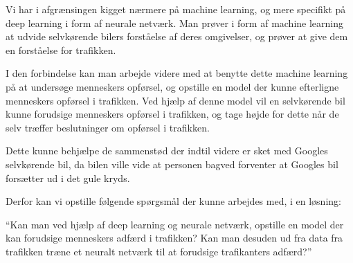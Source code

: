 Vi har i afgrænsingen kigget nærmere på machine learning, og mere specifikt på deep learning i form af neurale netværk. Man prøver i form af machine learning at udvide selvkørende bilers forståelse af deres omgivelser, og prøver at give dem en forståelse for trafikken. 

I den forbindelse kan man arbejde videre med at benytte dette machine learning på at undersøge menneskers opførsel, og opstille en model der kunne efterligne menneskers opførsel i trafikken. Ved hjælp af denne model vil en selvkørende bil kunne forudsige menneskers opførsel i trafikken, og tage højde for dette når de selv træffer beslutninger om opførsel i trafikken. 

Dette kunne behjælpe de sammenstød der indtil videre er sket med Googles selvkørende bil, da bilen ville vide at personen bagved forventer at Googles bil forsætter ud i det gule kryds.

Derfor kan vi opstille følgende spørgsmål der kunne arbejdes med, i en løsning:

``Kan man ved hjælp af deep learning og neurale netværk, opstille en model der kan forudsige menneskers adfærd i trafikken? Kan man desuden ud fra data fra trafikken træne et neuralt netværk til at forudsige trafikanters adfærd?''
